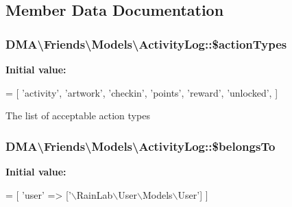 

\subsection{Member Data Documentation}
\hypertarget{classDMA_1_1Friends_1_1Models_1_1ActivityLog_aa60b5fe0e1e7c254827bfa35c69aef9d}{}
\subsubsection[{\$action\+Types}]{\setlength{\rightskip}{0pt plus 5cm}D\+M\+A\textbackslash{}\+Friends\textbackslash{}\+Models\textbackslash{}\+Activity\+Log\+::\$action\+Types}\label{classDMA_1_1Friends_1_1Models_1_1ActivityLog_aa60b5fe0e1e7c254827bfa35c69aef9d}
{\bfseries Initial value\+:}
\begin{DoxyCode}
= [
        \textcolor{stringliteral}{'activity'},
        \textcolor{stringliteral}{'artwork'},
        \textcolor{stringliteral}{'checkin'},
        \textcolor{stringliteral}{'points'},
        \textcolor{stringliteral}{'reward'},
        \textcolor{stringliteral}{'unlocked'},
    ]
\end{DoxyCode}
The list of acceptable action types \hypertarget{classDMA_1_1Friends_1_1Models_1_1ActivityLog_aff637d41ffa73260e1ffc1788f5a98d7}{}
\subsubsection[{\$belongs\+To}]{\setlength{\rightskip}{0pt plus 5cm}D\+M\+A\textbackslash{}\+Friends\textbackslash{}\+Models\textbackslash{}\+Activity\+Log\+::\$belongs\+To}\label{classDMA_1_1Friends_1_1Models_1_1ActivityLog_aff637d41ffa73260e1ffc1788f5a98d7}
{\bfseries Initial value\+:}
\begin{DoxyCode}
= [
        \textcolor{stringliteral}{'user'} => [\textcolor{stringliteral}{'\(\backslash\)RainLab\(\backslash\)User\(\backslash\)Models\(\backslash\)User'}]
    ]
\end{DoxyCode}
\hypertarget{classDMA_1_1Friends_1_1Models_1_1ActivityLog_afaa82849e3e93bf41ac948658ac652ff}{}
